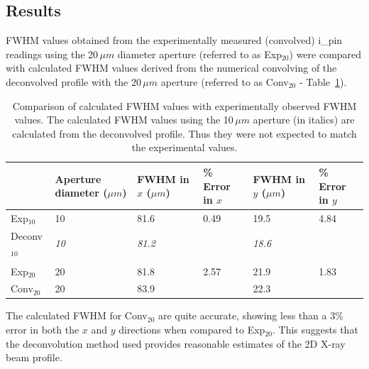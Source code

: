 \subsection{Results}
\label{sub:Results - DLS}
FWHM values obtained from the experimentally measured (convolved) i\_pin readings using the 20$\,\mu m$ diameter aperture (referred to as Exp$_{\text{20}}$) were compared with calculated FWHM values derived from the numerical convolving of the deconvolved profile with the 20$\,\mu m$ aperture (referred to as Conv$_{\text{20}}$ - Table~\ref{tab:FWHM comparison - DLS}).
\begin{table}[h!]
	\caption[Comparison of calculated FWHM values with experimentally observed FWHM values.]{Comparison of calculated FWHM values with experimentally observed FWHM values.
    The calculated FWHM values using the 10$\,\mu m$ aperture (in italics) are calculated from the deconvolved profile.
    Thus they were not expected to match the experimental values.}
	\begin{tabular}{p{2.5cm} p{2.5cm} p{2cm} p{1.5cm} p{2cm} p{1.5cm}}
        &  Aperture diameter ($\mu m$) & FWHM in $x$ ($\mu m$) 	&	\% Error in $x$		& FWHM in $y$ ($\mu m$) 	&	\% Error in $y$ \\
		\hline
		Exp$_{\text{10}}$         & 10              & 81.6 	            &	0.49      & 19.5 	        & 4.84	\\
		Deconv$_{\text{10}}$      & \textit{10}     & \textit{81.2}     &  	          & \textit{18.6} 	&		\\
                                  &                 &			        &			  &    		        &		\\
        Exp$_{\text{20}}$         & 20              & 81.8              &   2.57      & 21.9            & 1.83  \\
		Conv$_{\text{20}}$        & 20              & 83.9              &             & 22.3            &    	\\
	\end{tabular}
	\label{tab:FWHM comparison - DLS}
\end{table}
The calculated FWHM for Conv$_{\text{20}}$ are quite accurate, showing less than a 3\% error in both the $x$ and $y$ directions when compared to Exp$_{\text{20}}$.
This suggests that the deconvolution method used provides reasonable estimates of the 2D X-ray beam profile.

